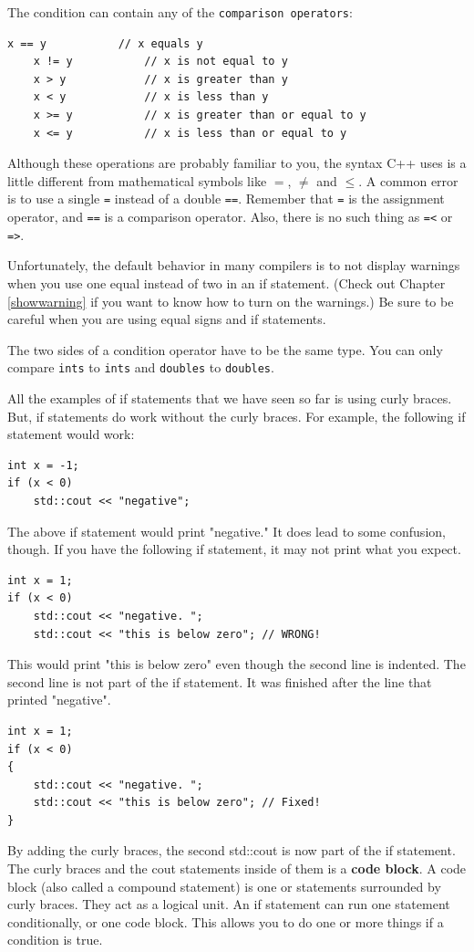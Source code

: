 
The condition can contain any of the {\tt comparison operators}:

\begin{lstlisting}[frame=single]
    x == y           // x equals y
    x != y           // x is not equal to y
    x > y            // x is greater than y
    x < y            // x is less than y
    x >= y           // x is greater than or equal to y
    x <= y           // x is less than or equal to y
\end{lstlisting}
%
Although these operations are probably familiar to you, the
syntax C++ uses is a little different from mathematical
symbols like $=$, $\neq$ and $\le$.  A common error is
to use a single {\tt =} instead of a double {\tt ==}.  Remember
that {\tt =} is the assignment operator, and {\tt ==} is
a comparison operator.  Also, there is no such thing as
{\tt =<} or {\tt =>}.

Unfortunately, the default behavior in many compilers is to not display warnings when you use one equal instead of two in an if statement. (Check out Chapter \ref{showwarning} if you want to know how to turn on the warnings.) Be sure to be careful when you are using equal signs and if statements.

The two sides of a condition operator have to be the same
type.  You can only compare {\tt ints} to {\tt ints} and
{\tt doubles} to {\tt doubles}. 

All the examples of if statements that we have seen so far is using curly
braces. But, if statements do work without the curly braces. For example, the
following if statement would work:
\begin{lstlisting}
int x = -1;
if (x < 0)
    std::cout << "negative";
\end{lstlisting}
The above if statement would print "negative." It does lead to some confusion, though. 
If you have the following if statement, it may not print what you expect.
\begin{lstlisting}
int x = 1;
if (x < 0)
    std::cout << "negative. ";
    std::cout << "this is below zero"; // WRONG!
\end{lstlisting}
This would print "this is below zero" even though the second line is indented. 
The second line is not part of the if statement. It was finished after the
line that printed "negative".  
\begin{lstlisting}
int x = 1;
if (x < 0)
{
    std::cout << "negative. ";
    std::cout << "this is below zero"; // Fixed!
}
\end{lstlisting}
By adding the curly braces, the second std::cout is now part of the if statement.
The curly braces and the cout statements inside of them is a {\bf code block}. A code
block (also called a compound statement) is one or statements surrounded by curly braces.
They act as a logical unit. An if statement can run one statement conditionally, or
one code block. This allows you to do one or more things if a condition is true.

